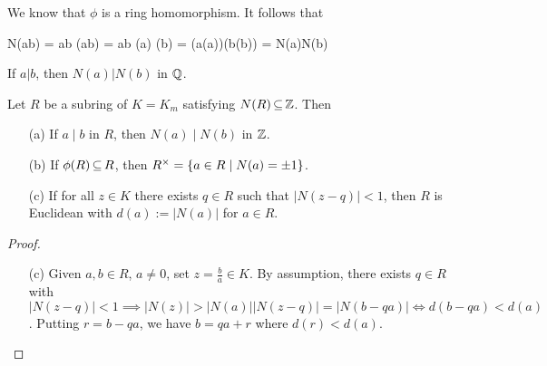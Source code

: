 \documentclass[11pt]{book}
\theoremstyle{definition}   \newtheorem{defn}[counter]{Definition} %
\newcommand{\vs}{\vspace{8pt}}
\numberwithin{counter}{chapter}
\begin{document}
\begin{pf}
	We know that $\phi$ is a ring homomorphism.  It follows that

	N(ab) = ab \phi(ab) = ab \phi(a) \phi(b) = (a\phi(a))(b\phi(b)) = N(a)N(b)
\end{pf}

\vs

\begin{thm}
	If $a|b$, then $N(a) | N(b)$ in $\operatorname{\mathbb{Q}}$.
\end{thm}

\vs

\begin{lemma}
Let $R$ be a subring of $K = K_m$ satisfying $N(R) \operatorname{\subseteq} \operatorname{\mathbb{Z}}$. Then
\begin{enumerate}
\item[(a)] If $a \mid b$ in $R$, then $N(a) \mid N(b)$ in $\operatorname{\mathbb{Z}}$.
\item[(b)] If $\phi(R) \operatorname{\subseteq} R$, then $R^{\times} = \{a \in R \mid N(a) = \pm1\}$.
\item[(c)] If for all $z \in K$ there exists $q \in R$ such that $|N(z-q)| < 1$, then $R$ is Euclidean with $d(a) := |N(a)|$ for $a \in R$.
\end{enumerate}
\end{lemma}
\begin{proof}
\
\begin{enumerate}
\item[(c)] Given $a,b \in R$, $a \ne 0$, set $z = \frac{b}{a} \in K$. By assumption, there exists $q \in R$ with $|N(z-q)| < 1 \implies |N(z)| > |N(a)||N(z-q)| = |N(b-qa)| \iff d(b-qa) < d(a)$. Putting $r = b-qa$, we have $b = qa + r$ where $d(r) < d(a)$.
\end{enumerate}
\end{proof}

\vs
\end{document}
